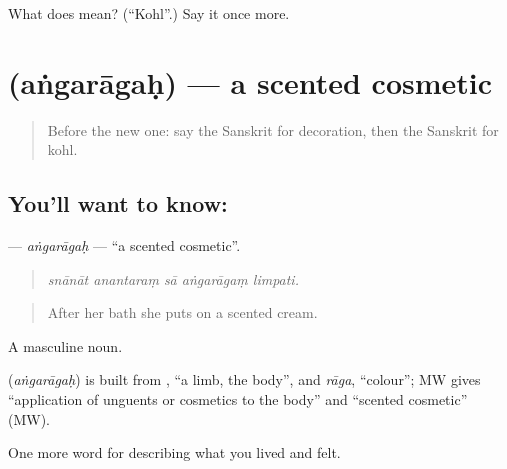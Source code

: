 \begin{tcolorbox}[breakable,colback=teal!4,colframe=teal!35!black,title={Before you move on}]
What does  mean? (\textquotedblleft{}Kohl\textquotedblright{}.) Say it once more.
\end{tcolorbox}
\section[\texorpdfstring{\sk{अंगरागः} (aṅgarāgaḥ)}{अंगरागः (aṅgarāgaḥ)}]{ (aṅgarāgaḥ) — a scented cosmetic}

\label{lesson:SA-C487-angaragah}



\begin{quote}
Before the new one: say the Sanskrit for decoration, then the Sanskrit for kohl.
\end{quote}

\subsection*{You'll want to know: }
\textbf{} — \emph{aṅgarāgaḥ} — \textquotedblleft{}a scented cosmetic\textquotedblright{}.

\begin{quote}
    
\end{quote}

\begin{quote}
\emph{snānāt anantaraṃ sā aṅgarāgaṃ limpati.}
\end{quote}

\begin{quote}
After her bath she puts on a scented cream.
\end{quote}

A masculine noun.

\begin{cousinweb}
\textbf{} (\emph{aṅgarāgaḥ}) is built from \textbf{}, \textquotedblleft{}a limb, the body\textquotedblright{}, and \emph{rāga}, \textquotedblleft{}colour\textquotedblright{}; MW gives \textquotedblleft{}application of unguents or cosmetics to the body\textquotedblright{} and \textquotedblleft{}scented cosmetic\textquotedblright{} (MW).
\end{cousinweb}

\begin{grammarlens}[title={What you've built}]
One more word for describing what you lived and felt.
\end{grammarlens}

